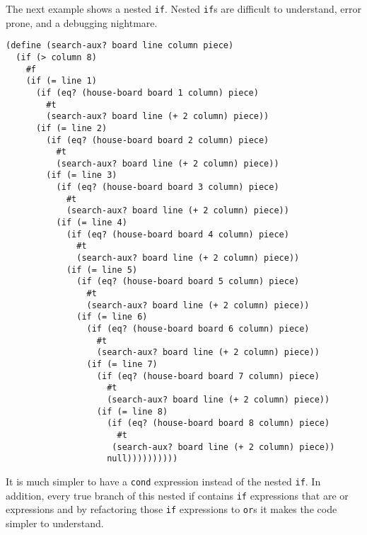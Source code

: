 The next example shows a nested {\tt if}. Nested {\tt if}s are
 difficult to understand, error prone, and a debugging nightmare.


\begin{lstlisting}
(define (search-aux? board line column piece)
  (if (> column 8)
    #f
    (if (= line 1)
      (if (eq? (house-board board 1 column) piece)
        #t
        (search-aux? board line (+ 2 column) piece))
      (if (= line 2)
        (if (eq? (house-board board 2 column) piece)
          #t
          (search-aux? board line (+ 2 column) piece))
        (if (= line 3)
          (if (eq? (house-board board 3 column) piece)
            #t
            (search-aux? board line (+ 2 column) piece))
          (if (= line 4)
            (if (eq? (house-board board 4 column) piece)
              #t
              (search-aux? board line (+ 2 column) piece))
            (if (= line 5)
              (if (eq? (house-board board 5 column) piece)
                #t
                (search-aux? board line (+ 2 column) piece))
              (if (= line 6)
                (if (eq? (house-board board 6 column) piece)
                  #t
                  (search-aux? board line (+ 2 column) piece))
                (if (= line 7)
                  (if (eq? (house-board board 7 column) piece)
                    #t
                    (search-aux? board line (+ 2 column) piece))
                  (if (= line 8)
                    (if (eq? (house-board board 8 column) piece)
                      #t
                     (search-aux? board line (+ 2 column) piece))
                    null))))))))))
\end{lstlisting}
It is much simpler to have a {\tt cond} expression instead of the nested {\tt if}.
In addition, every true branch of this nested if contains {\tt if} expressions that are
or expressions and by refactoring those {\tt if} expressions to {\tt or}s it makes the code
simpler to understand.


